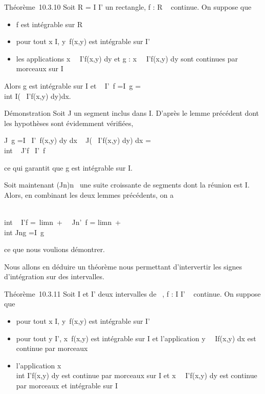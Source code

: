 Théorème~10.3.10 Soit R = I \times I' un rectangle, f : R \rightarrow~  continue. On
suppose que

\begin{itemize}
\itemsep1pt\parskip0pt
\item
  f est intégrable sur R
\item
  pour tout x \in I, y\mapsto~f(x,y) est intégrable
  sur I'
\item
  les applications
  x\mapsto~\int ~
  I'\textbar{}f(x,y)\textbar{} dy et g :
  x\mapsto~\int ~
  I'f(x,y) dy sont continues par morceaux sur I
\end{itemize}

Alors g est intégrable sur I et \int ~
\int  I\timesI'~f
=\int  I~g =\\int
 I\left (\int ~
I'f(x,y) dy\right )dx.

Démonstration Soit J un segment inclus dans I. D'après le lemme
précédent dont les hypothèses sont évidemment vérifiées,

\int  J~\textbar{}g\textbar{}
=\int  I~\left
\textbar{}\int  I'~f(x,y)
dy\right \textbar{} dx \leq\int ~
J\left (\int ~
I'\textbar{}f(x,y)\textbar{} dy\right ) dx
=\int  \\int ~
J\timesI'\textbar{}f\textbar{}\leq\int ~
\int  I\timesI'~\textbar{}f\textbar{}

ce qui garantit que g est intégrable sur I.

Soit maintenant (Jn)n\in{}~ une suite croissante de
segments dont la réunion est I. Alors, en combinant les deux lemmes
précédents, on a

\int  \\int ~
I\timesI'f =\
limn\rightarrow~+\infty~\int ~
\int  Jn\timesI'~f
= limn\rightarrow~+\infty~~\\int
 Jng =\int  I~g

ce que nous voulions démontrer.

Nous allons en déduire un théorème nous permettant d'intervertir les
signes d'intégration sur des intervalles.

Théorème~10.3.11 Soit I et I' deux intervalles de ~, f : I \times I' \rightarrow~ 
continue. On suppose que

\begin{itemize}
\itemsep1pt\parskip0pt
\item
  pour tout x \in I, y\mapsto~f(x,y) est intégrable
  sur I'
\item
  pour tout y \in I', x\mapsto~f(x,y) est intégrable
  sur I et l'application
  y\mapsto~\int ~
  If(x,y) dx est continue par morceaux
\item
  l'application x\mapsto~\\int
   I'f(x,y) dy est continue par morceaux sur I et
  x\mapsto~\int ~
  I'\textbar{}f(x,y)\textbar{} dy est continue par morceaux et
  intégrable sur I
\end{itemize}

